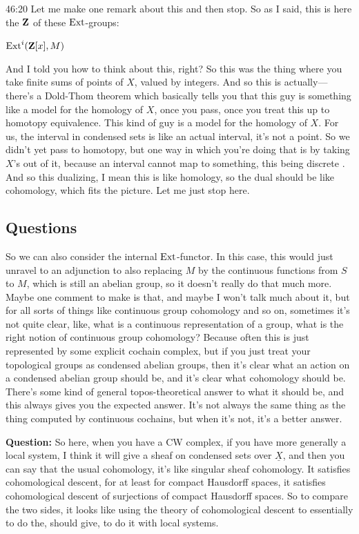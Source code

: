 \begin{unfinished}{46:20}
Let me make one remark about this and then stop. So as I said, this is here the $\mathbf Z$ of these $\operatorname{Ext}$-groups:

$\operatorname{Ext}^i(\mathbf Z[x], M)$ %

And I told you how to think about this, right? 
So this was the thing where you take finite sums of points of $X$, valued by integers. 
And so this is actually---there's a Dold-Thom theorem which basically tells you that this guy is something like a model for the homology of $X$, once you pass, once you treat this up to homotopy equivalence. 
This kind of guy is a model for the homology of $X$. For us, the interval in condensed sets is like an actual interval, it's not a point. So we didn't yet pass to homotopy, but one way in which you're doing that is by taking $X$'s out of it, because an interval cannot map to something, this being discrete . And so this dualizing, I mean this is like homology, so the dual should be like cohomology, which fits the picture. Let me just stop here.

\subsection{Questions}
So we can also consider the internal $\operatorname{Ext}$-functor. In this case, this would just unravel to an adjunction to also replacing $M$ by the continuous functions from $S$ to $M$, which is still an abelian group, so it doesn't really do that much more. 
Maybe one comment to make is that, and maybe I won't talk much about it, but for all sorts of things like continuous group cohomology and so on, sometimes it's not quite clear, like, what is a continuous representation of a group, what is the right notion of continuous group cohomology? Because often this is just represented by some explicit cochain complex, but if you just treat your topological groups as condensed abelian groups, then it's clear what an action on a condensed abelian group should be, and it's clear what cohomology should be. There's some kind of general topos-theoretical answer to what it should be, and this always gives you the expected answer. 
It's not always the same thing as the thing computed by continuous cochains, but when it's not, it's a better answer.

\textbf{Question:} So here, when you have a CW complex, if you have more generally a local system, I think it will give a sheaf on condensed sets over $\underline{X}$, and then you can say that the usual cohomology, it's like singular sheaf cohomology. It satisfies cohomological descent, for at least for compact Hausdorff spaces, it satisfies cohomological descent of surjections of compact Hausdorff spaces. So to compare the two sides, it looks like using the theory of cohomological descent to essentially to do the, should give, to do it with local systems. 


\end{unfinished}
